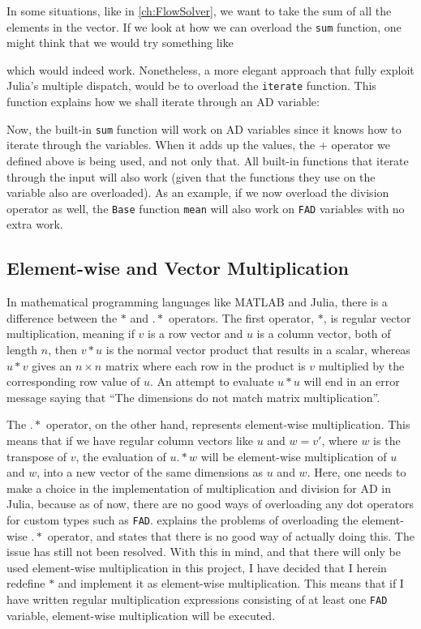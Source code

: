 In some situations, like in \autoref{ch:FlowSolver}, we want to take the sum of all the elements in the vector. If we look at how we can overload the \texttt{sum} function, one might think that we would try something like

which would indeed work. Nonetheless, a more elegant approach that fully exploit Julia's multiple dispatch, would be to overload the \texttt{iterate} function. This function explains how we shall iterate through an AD variable: 

Now, the built-in \texttt{sum} function will work on AD variables since it knows how to iterate through the variables. When it adds up the values, the $+$ operator we defined above is being used, and not only that. All built-in functions that iterate through the input will also work (given that the functions they use on the variable also are overloaded). As an example, if we now overload the division operator as well, the \texttt{Base} function \texttt{mean} will also work on \texttt{FAD} variables with no extra work.

\subsection{Element-wise and Vector Multiplication}
In mathematical programming languages like MATLAB and Julia, there is a difference between the $*$ and $.*$ operators. The first operator, $*$, is regular vector multiplication, meaning if $v$ is a row vector and $u$ is a column vector, both of length $n$, then $v*u$ is the normal vector product that results in a scalar, whereas $u*v$ gives an $n\times n$ matrix where each row in the product is $v$ multiplied by the corresponding row value of $u$. An attempt to evaluate $u*u$ will end in an error message saying that \enquote{The dimensions do not match matrix multiplication}. 

The $.*$ operator, on the other hand, represents element-wise multiplication. This means that if we have regular column vectors like $u$ and $w = v'$, where $w$ is the transpose of $v$, the evaluation of $u.*w$ will be element-wise multiplication of $u$ and $w$, into a new vector of the same dimensions as $u$ and $w$. Here, one needs to make a choice in the implementation of multiplication and division for AD in Julia, because as of now, there are no good ways of overloading any dot operators for custom types such as \texttt{FAD}. \emph{\citet{JuliaIssueDot}} explains the problems of overloading the element-wise $.*$ operator, and states that there is no good way of actually doing this. The issue has still not been resolved. With this in mind, and that there will only be used element-wise multiplication in this project, I have decided that I herein redefine $*$ and implement it as element-wise multiplication. This means that if I have written regular multiplication expressions consisting of at least one \texttt{FAD} variable, element-wise multiplication will be executed.

